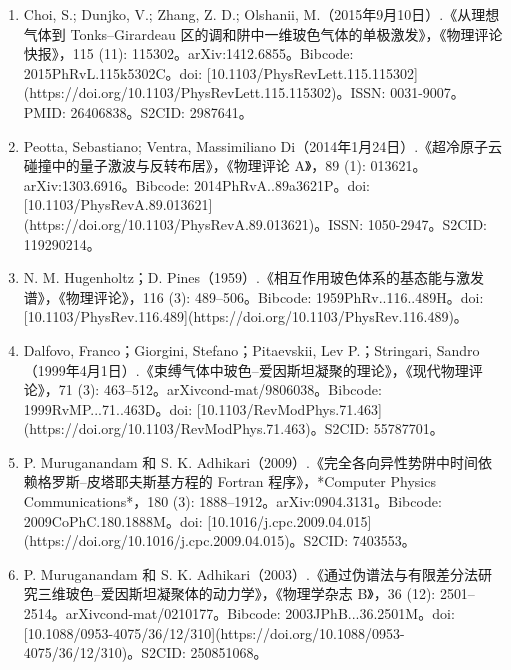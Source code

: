 \begin{enumerate}
\item Choi, S.; Dunjko, V.; Zhang, Z. D.; Olshanii, M.（2015年9月10日）.《从理想气体到 Tonks–Girardeau 区的调和阱中一维玻色气体的单极激发》，《物理评论快报》，115 (11): 115302。arXiv:1412.6855。Bibcode: 2015PhRvL.115k5302C。doi: [10.1103/PhysRevLett.115.115302](https://doi.org/10.1103/PhysRevLett.115.115302)。ISSN: 0031-9007。PMID: 26406838。S2CID: 2987641。
\item Peotta, Sebastiano; Ventra, Massimiliano Di（2014年1月24日）.《超冷原子云碰撞中的量子激波与反转布居》，《物理评论 A》，89 (1): 013621。arXiv:1303.6916。Bibcode: 2014PhRvA..89a3621P。doi: [10.1103/PhysRevA.89.013621](https://doi.org/10.1103/PhysRevA.89.013621)。ISSN: 1050-2947。S2CID: 119290214。
\item N. M. Hugenholtz；D. Pines（1959）.《相互作用玻色体系的基态能与激发谱》，《物理评论》，116 (3): 489–506。Bibcode: 1959PhRv..116..489H。doi: [10.1103/PhysRev.116.489](https://doi.org/10.1103/PhysRev.116.489)。
\item Dalfovo, Franco；Giorgini, Stefano；Pitaevskii, Lev P.；Stringari, Sandro（1999年4月1日）.《束缚气体中玻色–爱因斯坦凝聚的理论》，《现代物理评论》，71 (3): 463–512。arXiv\:cond-mat/9806038。Bibcode: 1999RvMP...71..463D。doi: [10.1103/RevModPhys.71.463](https://doi.org/10.1103/RevModPhys.71.463)。S2CID: 55787701。
\item P. Muruganandam 和 S. K. Adhikari（2009）.《完全各向异性势阱中时间依赖格罗斯–皮塔耶夫斯基方程的 Fortran 程序》，*Computer Physics Communications*，180 (3): 1888–1912。arXiv:0904.3131。Bibcode: 2009CoPhC.180.1888M。doi: [10.1016/j.cpc.2009.04.015](https://doi.org/10.1016/j.cpc.2009.04.015)。S2CID: 7403553。
\item P. Muruganandam 和 S. K. Adhikari（2003）.《通过伪谱法与有限差分法研究三维玻色–爱因斯坦凝聚体的动力学》，《物理学杂志 B》，36 (12): 2501–2514。arXiv\:cond-mat/0210177。Bibcode: 2003JPhB...36.2501M。doi: [10.1088/0953-4075/36/12/310](https://doi.org/10.1088/0953-4075/36/12/310)。S2CID: 250851068。

\end{enumerate}